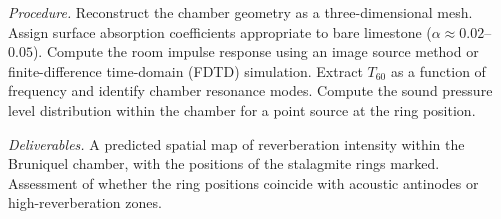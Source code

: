 \documentclass[12pt]{article}
\begin{document}
\textit{Procedure.} Reconstruct the chamber geometry as a three-dimensional mesh. Assign surface absorption coefficients appropriate to bare limestone ($\alpha \approx 0.02$--$0.05$). Compute the room impulse response using an image source method or finite-difference time-domain (FDTD) simulation. Extract $T_{60}$ as a function of frequency and identify chamber resonance modes. Compute the sound pressure level distribution within the chamber for a point source at the ring position.

\textit{Deliverables.} A predicted spatial map of reverberation intensity within the Bruniquel chamber, with the positions of the stalagmite rings marked. Assessment of whether the ring positions coincide with acoustic antinodes or high-reverberation zones.
\end{document}
